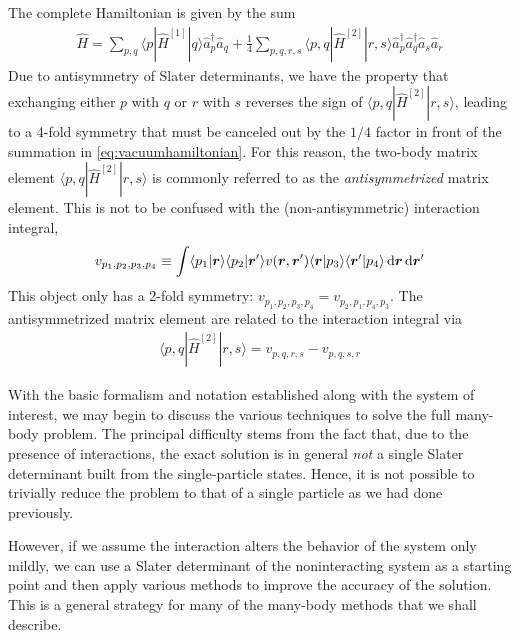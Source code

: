 The complete Hamiltonian is given by the sum
\begin{align}
  \hat{H} = \sum_{p, q} \langle p | \hat{H}^{[1]} | q \rangle \hat{a}_p^\dagger \hat{a}_q + \frac{1}{4} \sum_{p, q, r, s} \langle p, q | \hat{H}^{[2]} | r, s \rangle \hat{a}_p^\dagger \hat{a}_q^\dagger \hat{a}_s \hat{a}_r  \label{eq:vacuumhamiltonian}
\end{align}
Due to antisymmetry of Slater determinants, we have the property that exchanging either $p$ with $q$ or $r$ with $s$ reverses the sign of $\langle p, q | \hat{H}^{[2]} | r, s \rangle$, leading to a 4-fold symmetry that must be canceled out by the $1/4$ factor in front of the summation in \eqref{eq:vacuumhamiltonian}.  For this reason, the two-body matrix element $\langle p, q | \hat{H}^{[2]} | r, s \rangle$ is commonly referred to as the \emph{antisymmetrized} matrix element.  This is not to be confused with the (non-antisymmetric) interaction integral,
\begin{align} \label{eq:interactionintegral}
  v_{p_1, p_2, p_3, p_4} \equiv \int \langle p_1 | \bm{r} \rangle \langle p_2 | \bm{r}' \rangle v(\bm r, \bm r') \langle \bm{r} | p_3 \rangle \langle \bm{r}' | p_4 \rangle \operatorname{d\!} \bm{r} \operatorname{d\!} \bm{r}'
\end{align}
This object only has a 2-fold symmetry: $v_{p_1, p_2, p_3, p_4} = v_{p_2, p_1, p_4, p_3}$.  The antisymmetrized matrix element are related to the interaction integral via
\begin{align} \label{eq:antisymmetricmatrixelement}
  \langle p, q | \hat{H}^{[2]} | r, s \rangle = v_{p, q, r, s} - v_{p, q, s, r}
\end{align}

With the basic formalism and notation established along with the system of interest, we may begin to discuss the various techniques to solve the full many-body problem.  The principal difficulty stems from the fact that, due to the presence of interactions, the exact solution is in general \emph{not} a single Slater determinant built from the single-particle states.  Hence, it is not possible to trivially reduce the problem to that of a single particle as we had done previously.

However, if we assume the interaction alters the behavior of the system only mildly, we can use a Slater determinant of the noninteracting system as a starting point and then apply various methods to improve the accuracy of the solution.  This is a general strategy for many of the many-body methods that we shall describe.


